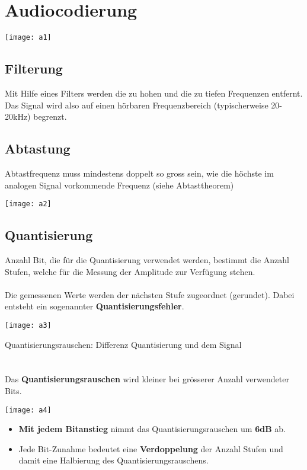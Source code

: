 \section{Audiocodierung}
\begin{center}
    \texttt{[image: a1]}
\end{center}
\subsection{Filterung}
Mit Hilfe eines Filters werden die zu hohen und die zu tiefen
Frequenzen entfernt. Das Signal wird also auf einen hörbaren
Frequenzbereich (typischerweise 20-20kHz) begrenzt.
\subsection{Abtastung}
Abtastfrequenz muss mindestens doppelt so gross sein, wie die
höchste im analogen Signal vorkommende Frequenz (siehe
Abtasttheorem)
\begin{center}
    \texttt{[image: a2]}
\end{center}
\subsection{Quantisierung}
Anzahl Bit, die für die Quantisierung verwendet werden, bestimmt
die Anzahl Stufen, welche für die Messung der Amplitude zur
Verfügung stehen.
\\
\\
Die gemessenen Werte werden der nächsten Stufe zugeordnet
(gerundet). Dabei entsteht ein sogenannter \textbf{Quantisierungsfehler}.
\begin{center}
    \texttt{[image: a3]}
\end{center}
Quantisierungsrauschen: Differenz Quantisierung und dem Signal
\\
\\
\\
Das \textbf{Quantisierungsrauschen} wird kleiner bei grösserer Anzahl
verwendeter Bits.
\begin{center}
    \texttt{[image: a4]}
\end{center}
\begin{itemize}
    \item \textbf{Mit jedem Bitanstieg} nimmt das Quantisierungsrauschen um \textbf{6dB} ab.
    \item Jede Bit-Zunahme bedeutet eine \textbf{Verdoppelung} der Anzahl Stufen und damit eine Halbierung des Quantisierungsrauschens.
\end{itemize}

